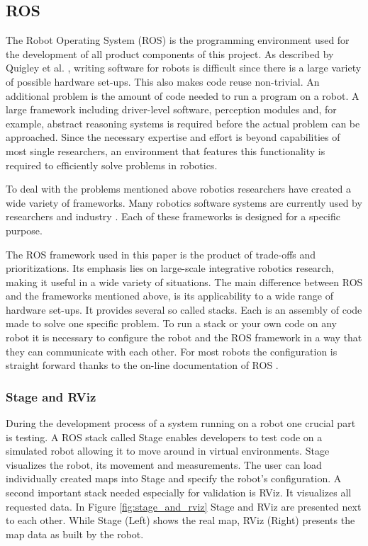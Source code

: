 \documentclass{ba-kecs}
\begin{document}
\subsection{ROS}
\label{subsec:ros}
The Robot Operating System (ROS) \cite{Quigley} is the programming environment used for the development of all product components of this project. As described by Quigley et al. \citep{Quigley}, writing software for robots is difficult since there is a large variety of possible hardware set-ups. This also makes code reuse non-trivial. An additional problem is the amount of code needed to run a program on a robot. A large framework including driver-level software, perception modules and, for example, abstract reasoning systems is required before the actual problem can be approached. Since the necessary expertise and effort is beyond capabilities of most single researchers, an environment that features this functionality is required to efficiently solve problems in robotics.

To deal with the problems mentioned above robotics researchers have created a wide variety of frameworks. Many robotics software systems are currently used by researchers and industry \cite{Kramer}. Each of these frameworks is designed for a specific purpose.

The ROS framework used in this paper is the product of trade-offs and prioritizations. Its emphasis lies on large-scale integrative robotics research, making it useful in a wide variety of situations. The main difference between ROS and the frameworks mentioned above, is its applicability to a wide range of hardware set-ups. It provides several so called stacks. Each is an assembly of code made to solve one specific problem. To run a stack or your own code on any robot it is necessary to configure the robot and the ROS framework in a way that they can communicate with each other. For most robots the configuration is straight forward thanks to the on-line documentation of ROS \citep{Roswiki}.

\subsubsection{Stage and RViz}
During the development process of a system running on a robot one crucial part is testing. A ROS stack called Stage enables developers to test code on a simulated robot allowing it to move around in virtual environments. Stage visualizes the robot, its movement and measurements. The user can load individually created maps into Stage and specify the robot's configuration. A second important stack needed especially for validation is RViz. It visualizes all requested data. In Figure \ref{fig:stage_and_rviz} Stage and RViz are presented next to each other. While Stage (Left) shows the real map, RViz (Right) presents the map data as built by the robot.
\end{document}
